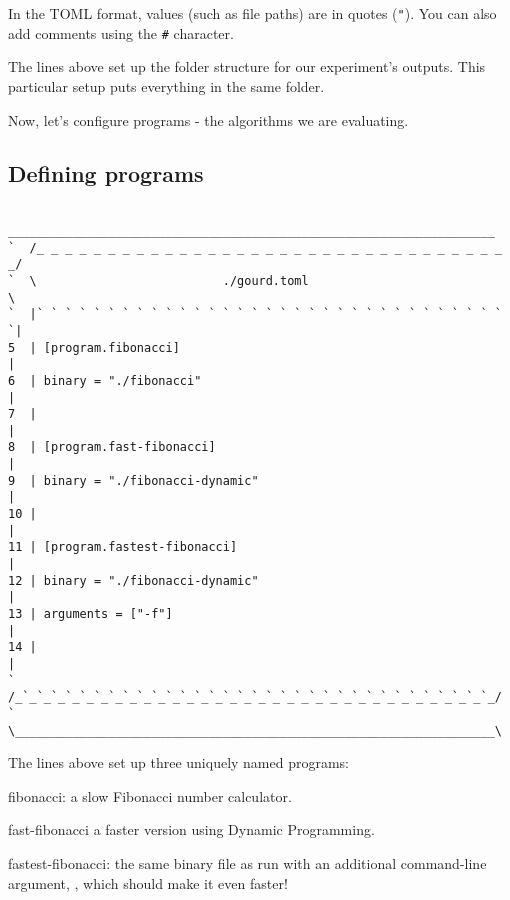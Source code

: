 \documentclass[a4paper,english]{article}
\begin{document}
\begin{adjustwidth}{18pt}{0pt}
    In the TOML format, values (such as file paths) are in quotes (\verb|"|).
    You can also add comments using the \verb|#| character.

    The lines above set up the folder structure for our experiment's outputs.
    This particular setup puts everything in the same folder.

    Now, let's configure programs - the algorithms we are evaluating.

    \subsection{Defining programs}

    \begin{verbatim}
    ____________________________________________________________________
`  /_ _ _ _ _ _ _ _ _ _ _ _ _ _ _ _ _ _ _ _ _ _ _ _ _ _ _ _ _ _ _ _ _ _/
`  \                          ./gourd.toml                             \
`  |` ` ` ` ` ` ` ` ` ` ` ` ` ` ` ` ` ` ` ` ` ` ` ` ` ` ` ` ` ` ` ` ` `|
5  | [program.fibonacci]                                               |
6  | binary = "./fibonacci"                                            |
7  |                                                                   |
8  | [program.fast-fibonacci]                                          |
9  | binary = "./fibonacci-dynamic"                                    |
10 |                                                                   |
11 | [program.fastest-fibonacci]                                       |
12 | binary = "./fibonacci-dynamic"                                    |
13 | arguments = ["-f"]                                                |
14 |                                                                   |
`  /_`_`_`_`_`_`_`_`_`_`_`_`_`_`_`_`_`_`_`_`_`_`_`_`_`_`_`_`_`_`_`_`_`_/
`  \___________________________________________________________________\
    \end{verbatim}

    The lines above set up three uniquely named programs:
    \begin{Description}[programs]\setlength{\itemsep}{0cm}
    \item[fibonacci:] a slow Fibonacci number calculator.
    \item[fast-fibonacci] a faster version using Dynamic Programming.
    \item[fastest-fibonacci:] the same binary file as  run
      with an additional command-line argument, \Opt{-f}, which should make it
      even faster!
    \end{Description}


\end{adjustwidth}
\end{document}
